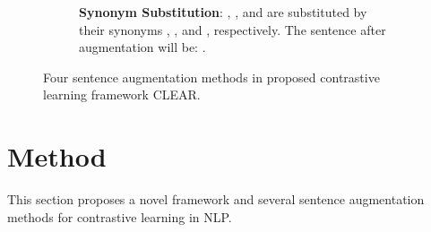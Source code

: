\documentclass[11pt,a4paper]{article}
\begin{document}
\begin{figure*}[t]
\begin{subfigure}[t]{0.4\textwidth}
\begin{tikzpicture}
  \end{tikzpicture}

   \caption{\textbf{Synonym Substitution}: , , and  are substituted by their synonyms , , and , respectively. The sentence after augmentation will be:  .}
    \label{fig:subs}
 \end{subfigure}
 
\caption{Four sentence augmentation methods in proposed contrastive learning framework CLEAR.}
\label{fig:augmentations}
\end{figure*}

 \section{Method} \label{method}
This section proposes a novel framework and several sentence augmentation methods for contrastive learning in NLP. 
\end{document}
